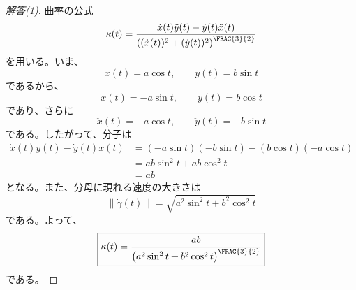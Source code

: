 \documentclass[article,paper=a4paper]{jlreq}
\begin{document}
\begin{proof}[解答(1)]
    曲率の公式
    \[
        \kappa(t)
        =
        \frac{\dot{x}(t)\ddot{y}(t)-\dot{y}(t)\ddot{x}(t)}
        {\left((\dot{x}(t))^2+(\dot{y}(t))^2\right)^{\FRAC{3}{2}}}
    \]
    を用いる。いま、
    \[
        x(t)=a\cos t,\qquad y(t)=b\sin t
    \]
    であるから、
    \[
        \dot{x}(t)=-a\sin t,\qquad
        \dot{y}(t)=b\cos t
    \]
    であり、さらに
    \[
        \ddot{x}(t)=-a\cos t,\qquad
        \ddot{y}(t)=-b\sin t
    \]
    である。したがって、分子は
    \begin{align*}
        \dot{x}(t)\ddot{y}(t)-\dot{y}(t)\ddot{x}(t)
        &=
        (-a\sin t)(-b\sin t)
        -
        (b\cos t)(-a\cos t)\\
        &=
        ab\sin^2 t+ab\cos^2 t\\
        &=
        ab
    \end{align*}
    となる。また、分母に現れる速度の大きさは
    \[
        \left\|\dot{\gamma}(t)\right\|
        =
        \sqrt{a^2\sin^2 t+b^2\cos^2 t}
    \]
    である。よって、
    \[
        \boxed{
        \kappa(t)
        =
        \frac{ab}
        {\left(a^2\sin^2 t+b^2\cos^2 t\right)^{\FRAC{3}{2}}}
        }
    \]
    である。
\end{proof}  
    
\end{document}
